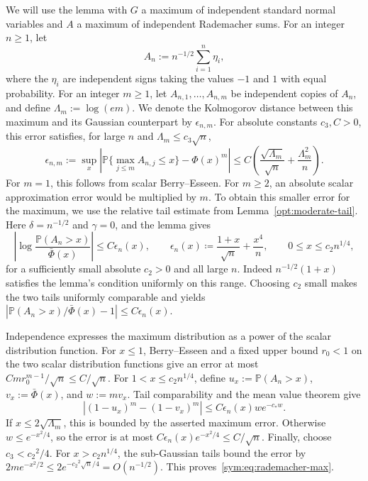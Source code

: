 \documentclass[11pt,letterpaper]{article}
\newenvironment{recovered}{}{}
\newcommand{\vSix}[1]{{\color{magenta}#1}}
\theoremstyle{remark}
\newcommand{\Pp}{\mathbb P}
\begin{document}
We will use the lemma with \(G\) a maximum of independent standard
normal variables and \(A\) a maximum of independent Rademacher sums.
{For an integer \(n\ge1\), let}
\[
 A_n:=n^{-1/2}\sum_{i=1}^n\eta_i,
\]
where the \(\eta_i\) are independent signs taking the values
\(-1\) and \(1\) with equal probability. \vSix{For an integer \(m\ge1\), let}
\(A_{n,1},\ldots,A_{n,m}\) be independent copies of \(A_n\), and {define}
\(\Lambda_m:=\log(em)\).
\begin{recovered}
We denote the Kolmogorov distance between this maximum and its
Gaussian counterpart by \(\epsilon_{n,m}\). For absolute constants
\({c_3},C>0\), this error satisfies, for large \(n\) and
\(\Lambda_m\le {c_3}\sqrt n\),
\end{recovered}
\begin{equation}
 \epsilon_{n,m}:=\sup_x\left|\Pp\{\max_{j\le m}A_{n,j}\le x\}-\Phi(x)^m\right|
 \le C\left(\frac{\sqrt{\Lambda_m}}{\sqrt n}
                 +\frac{\Lambda_m^2}{n}\right).
 \label{sym:eq:rademacher-max}
\end{equation}
\vSix{For \(m=1\), this follows from scalar Berry--Esseen.
For \(m\ge2\),} an absolute scalar approximation error would be multiplied by \(m\).
To obtain this smaller error for the maximum, we use the relative
tail estimate from Lemma~\ref{opt:moderate-tail}. Here
\(\delta=n^{-1/2}\) and \(\gamma=0\), and the lemma gives
\[
 \left|\log\frac{\Pp(A_n>x)}{\bar\Phi(x)}\right|
 \le C\epsilon_n(x),\qquad
 \epsilon_n(x)\coloneqq\frac{1+x}{\sqrt n}+\frac{x^4}{n},
 \qquad 0\le x\le {c_2}n^{1/4},
\]
for a sufficiently small absolute \({c_2}>0\) and all large \(n\).
Indeed \(n^{-1/2}(1+x)\) satisfies the lemma's condition uniformly
on this range. Choosing \({c_2}\) small makes the two tails uniformly
comparable and yields
\(\left|\Pp(A_n>x)/\bar\Phi(x)-1\right|\le C\epsilon_n(x)\).

Independence expresses the maximum distribution as a power of the
scalar distribution function. For \(x\le1\),
Berry--Esseen and a fixed upper bound \(r_0<1\) on the two scalar
distribution functions give an error at most
\(Cm r_0^{m-1}/\sqrt n\le C/\sqrt n\). For
\(1<x\le {c_2}n^{1/4}\), {define} \(u_x:=\Pp(A_n>x)\),
\(v_x:=\bar\Phi(x)\), and \(w:=mv_x\).
Tail comparability and the mean value theorem give
\[
 |(1-u_x)^m-(1-v_x)^m|\le C\epsilon_n(x)w e^{-c_*w}.
\]
If \(x\le2\sqrt{\Lambda_m}\), this is bounded by the asserted
maximum error. Otherwise \(w\le e^{-x^2/4}\), so the error is
at most \(C\epsilon_n(x)e^{-x^2/4}\le C/\sqrt n\).
Finally, choose \({c_3}<{c_2}^2/4\). For \(x>{c_2}n^{1/4}\), the
sub-Gaussian tails bound the error by
\(2m e^{-x^2/2}\le2e^{-{c_2}^2\sqrt n/4}=O(n^{-1/2})\).
This proves~\eqref{sym:eq:rademacher-max}.
\end{document}
